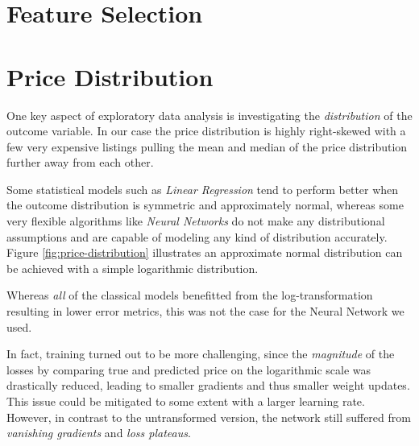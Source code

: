 \documentclass[12pt, letterpaper]{article}
\begin{document}
\section{Feature Selection}


\section{Price Distribution}

One key aspect of exploratory data analysis is investigating the \emph{distribution} of the outcome variable.
In our case the price distribution is highly right-skewed with a few very expensive listings pulling the mean and median of the price distribution further away from each other.

Some statistical models such as \emph{Linear Regression} tend to perform better when the outcome distribution is symmetric and approximately normal, whereas some very flexible algorithms like \emph{Neural Networks} do not make any distributional assumptions and are capable of modeling any kind of distribution accurately.
Figure \ref{fig:price-distribution} illustrates an approximate normal distribution can be achieved with a simple logarithmic distribution.

Whereas \emph{all} of the classical models benefitted from the log-transformation resulting in lower error metrics, this was not the case for the Neural Network we used.

In fact, training turned out to be more challenging, since the \emph{magnitude} of the losses by comparing true and predicted price on the logarithmic scale was drastically reduced, leading to smaller gradients and thus smaller weight updates.
This issue could be mitigated to some extent with a larger learning rate.
However, in contrast to the untransformed version, the network still suffered from \emph{vanishing gradients} and \emph{loss plateaus}.



\newpage




\appendix
\end{document}
